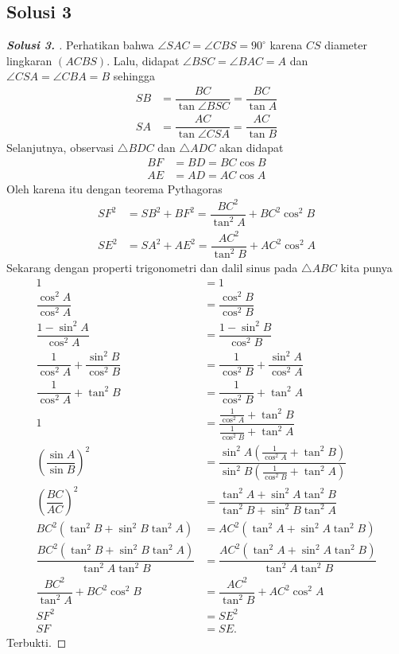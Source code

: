 \documentclass[11pt]{scrartcl}
\begin{document}
\subsection{Solusi 3}
\begin{proof}[\textbf{Solusi 3. }] 
Perhatikan bahwa $\angle SAC = \angle CBS = 90^\circ$ karena $CS$ diameter lingkaran $(ACBS)$. Lalu, didapat $\angle BSC = \angle BAC = A$ dan $\angle CSA = \angle CBA = B$ sehingga
\begin{align*}
    SB &= \dfrac{BC}{\tan \angle BSC} = \dfrac{BC}{\tan A}\\
    SA &= \dfrac{AC}{\tan \angle CSA} = \dfrac{AC}{\tan B}
\end{align*}
Selanjutnya, observasi $\triangle BDC$ dan $\triangle ADC$ akan didapat
\begin{align*}
    BF &= BD = BC \cos B\\
    AE &= AD = AC \cos A
\end{align*}
Oleh karena itu dengan teorema Pythagoras
\begin{align*}
    SF^2 &= SB^2 + BF^2 = \dfrac{BC^2}{\tan^2 A} + BC^2 \cos^2 B\\
    SE^2 &= SA^2 + AE^2 = \dfrac{AC^2}{\tan^2 B} + AC^2 \cos^2 A
\end{align*}
Sekarang dengan properti trigonometri dan dalil sinus pada $\triangle ABC$ kita punya
\begin{align*}
    1 &= 1\\
    \dfrac{\cos^2 A}{\cos^2 A} &= \dfrac{\cos^2 B}{\cos^2 B}\\
    \dfrac{1-\sin^2 A}{\cos^2 A} &= \dfrac{1-\sin^2 B}{\cos^2 B}\\
    \dfrac{1}{\cos^2 A}+\dfrac{\sin^2 B}{\cos^2 B} &= \dfrac{1}{\cos^2 B}+\dfrac{\sin^2 A}{\cos^2 A}\\
    \dfrac{1}{\cos^2 A}+\tan^2 B &= \dfrac{1}{\cos^2 B}+\tan^2 A\\
    1 &= \dfrac{\frac{1}{\cos^2 A}+\tan^2 B}{\frac{1}{\cos^2 B}+\tan^2 A}\\
    \left(\dfrac{\sin A}{\sin B}\right)^2 &= \dfrac{\sin^2 A\left(\frac{1}{\cos^2 A}+\tan^2 B\right)}{\sin^2 B\left(\frac{1}{\cos^2 B}+\tan^2 A\right)}\\
    \left(\dfrac{BC}{AC}\right)^2 &= \dfrac{\tan^2 A + \sin^2 A \tan^2 B}{\tan^2 B + \sin^2 B \tan^2 A}\\
    BC^2(\tan^2 B + \sin^2 B \tan^2 A) &= AC^2(\tan^2 A + \sin^2 A \tan^2 B)\\
    \dfrac{BC^2(\tan^2 B + \sin^2 B \tan^2 A)}{\tan^2 A \tan^2 B} &= \dfrac{AC^2(\tan^2 A + \sin^2 A \tan^2 B)}{\tan^2 A \tan^2 B}\\
    \dfrac{BC^2}{\tan^2 A} + BC^2 \cos^2 B &= \dfrac{AC^2}{\tan^2 B} + AC^2 \cos^2 A\\
    SF^2 &= SE^2\\
    SF &= SE.
\end{align*}
Terbukti.
\end{proof}
\end{document}

